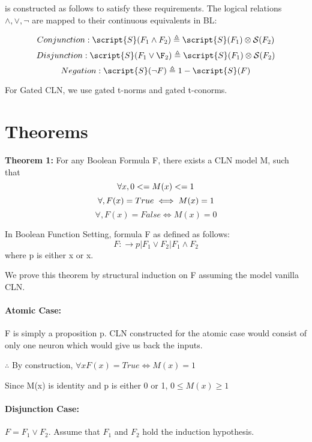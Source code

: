 is constructed as follows to satisfy these requirements. The
logical relations {$\wedge, \lor, \lnot$} are mapped to their continuous
equivalents in BL:

$$Conjunction: \script{S}(F_{1} \wedge F_{2}) \triangleq \script{S} (F_{1}) \otimes \mathcal{S} (F_{2})$$
$$Disjunction: \script{S}(F_{1} \lor \F_{2}) \triangleq \script{S} (F_{1}) \otimes \mathcal{S} (F_{2})$$
$$Negation: \script{S}(\neg{F}) \triangleq 1 - \script{S}(F)$$

For Gated CLN, we use gated t-norms and gated t-conorms.

\section{Theorems}
\noindent\textbf{Theorem 1: } For any Boolean Formula F, there exists a CLN model M, such that
\begin{equation}
    \forall x, 0 <= M(x) <= 1 \\
\end{equation}
\begin{equation}
    \forall, F(x) = True \iff M(x) = 1 \\
\end{equation}
\begin{equation}
    \forall, F(x) = False \iff M(x) = 0
\end{equation}

In Boolean Function Setting, formula F as defined as follows:
$$F:\rightarrow p | F_1 \lor F_2 | F_1 \wedge F_2$$
where p is either x or \neg x.

We prove this theorem by structural induction on F assuming the model vanilla CLN.

\noindent\paragraph{Atomic Case: } F is simply a proposition p. CLN constructed 
for the atomic case would consist of only one neuron which would give us back the inputs.

$\therefore$ By construction, $\forall x F(x) = True \iff M(x) = 1$

Since M(x) is identity and p is either 0 or 1, $0 \leq M(x) \geq 1$

\noindent\paragraph{Disjunction Case: } $F = F_1 \lor F_2$. 
Assume that $F_1$ and $F_2$ hold the induction hypothesis.

